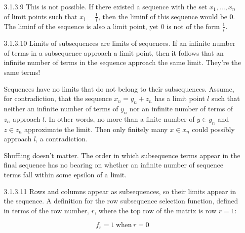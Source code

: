 \documentclass{article}
\begin{document}
\begin{enumerate}
\item[]
\item[3.1.3.9]
  This is not possible. If there existed a sequence 
  with the set $x_1,\ldots,x_n$ of limit points such
  that $x_i = \frac{1}{i}$, then the liminf of this sequence
  would be $0$. The liminf of the sequence is also a limit point, 
  yet $0$ is not of the form $\frac{1}{i}$.
  
\item[]
\item[3.1.3.10]
  Limits of subsequences are limits of sequences. If an infinite
  number of terms in a subsequence approach a limit point, then it 
  follows that an infinite number of terms in the sequence approach the
  same limit. They're the same terms!

  Sequences have no limits that do not belong to their subsequences. 
  Assume, for contradiction, that the sequence $x_n = y_n + z_n$ has 
  a limit point $l$ such that neither an infinite number of terms 
  of $y_n$ nor an infinite number of terms of $z_n$ approach $l$. 
  In other words, no more than a finite number of $y\in y_n$ and 
  $z \in z_n$ approximate the limit. Then only finitely many $x\in x_n$
  could possibly approach $l$, a contradiction.

  Shuffling doesn't matter. The order in which subsequence terms appear
  in the final sequence has no bearing on whether an infinite number of 
  sequence terms fall within some epsilon of a limit.
\item[]
\item[3.1.3.11]
  Rows and columns appear as subsequences, so their limits appear in the
  sequence. A definition for the row subsequence selection function, 
  defined in terms of the row number, $r$, where the top row of the matrix
  is row $r=1$:

  \[f_r = 1\ \text{when}\ r=0\]


\end{enumerate}
\end{document}
